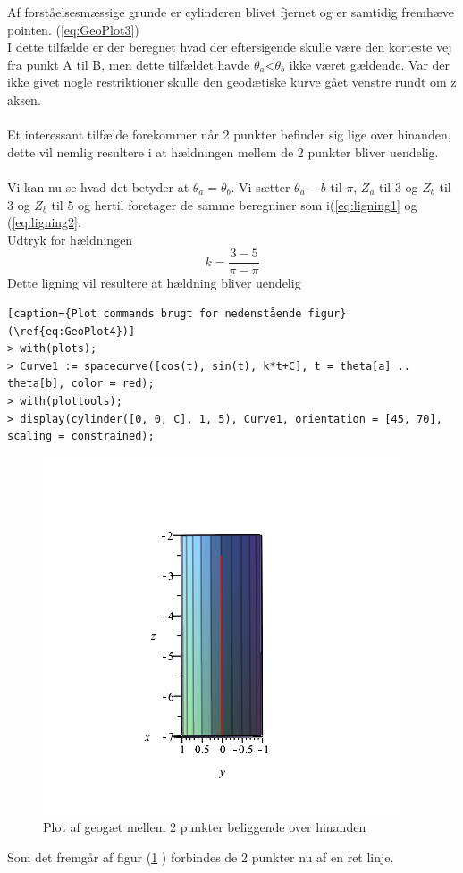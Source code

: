 Af forståelsesmæssige grunde er cylinderen blivet fjernet og er samtidig fremhæve pointen. (\ref{eq:GeoPlot3})
\\
I dette tilfælde er der beregnet hvad der eftersigende skulle være den korteste vej fra punkt A til B, men dette tilfældet havde $\theta_a$<$\theta_b$ ikke været gældende. Var der ikke givet nogle restriktioner skulle den geodætiske kurve gået venstre rundt om z aksen.
\\
\\
Et interessant tilfælde forekommer når 2 punkter befinder sig lige over hinanden, dette vil nemlig resultere i at hældningen mellem de 2 punkter bliver uendelig.
\\
\\
Vi kan nu se hvad det betyder at $\theta_a=\theta_b$. Vi sætter $\theta_a-b$ til $\pi$, $Z_a$ til 3 og $Z_b$ til 3 og $Z_b$ til 5 og hertil foretager de samme beregniner som i(\ref{eq:ligning1} og (\ref{eq:ligning2}.
\\
Udtryk for hældningen
\begin{equation}
k=\frac{3-5}{\pi-\pi}
\end{equation}
Dette ligning vil resultere at hældning bliver uendelig
\begin{lstlisting}[caption={Plot commands brugt for nedenstående figur}(\ref{eq:GeoPlot4})] 
> with(plots);
> Curve1 := spacecurve([cos(t), sin(t), k*t+C], t = theta[a] .. theta[b], color = red);
> with(plottools);
> display(cylinder([0, 0, C], 1, 5), Curve1, orientation = [45, 70], scaling = constrained);
\end{lstlisting}
\begin{figure}
\center
\includegraphics[scale=0.4]{pictures/Opg8_Figur44.png}
\caption{Plot af geogæt mellem 2 punkter beliggende over hinanden}
\label{eq:GeoPlot4}
\end{figure}
Som det fremgår af figur (\ref{eq:GeoPlot4} ) forbindes de 2 punkter nu af en ret linje.

